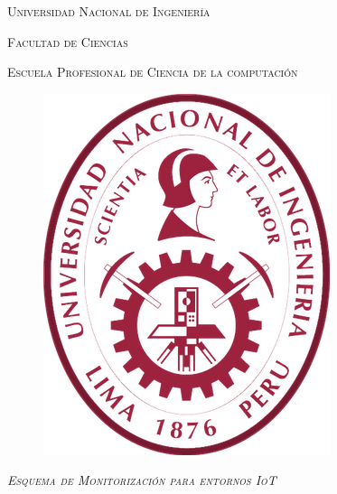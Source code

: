 \documentclass[12pt,spanish,openright]{book}
\begin{document}
	\begin{titlepage}
		\centering
		{\scshape \huge Universidad Nacional de Ingeniería \par}
		\vspace{0.2cm}
		{\scshape \Large Facultad de Ciencias \par}
		\vspace{0.2cm}
		{\scshape \large Escuela Profesional de Ciencia de la computación \par}
		\vspace{1cm}
		\begin{figure}[h]
			\centering
			\includegraphics[scale = 0.4]{figure/log_uni}
		\end{figure}
		
		\vspace{1cm}
		
		\textsc{\LARGE \textit{Esquema de Monitorización para entornos IoT }}\\[2cm] 
		
	\end{titlepage}
	
\end{document}
